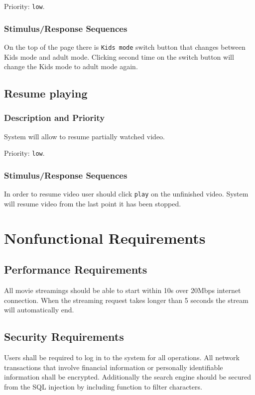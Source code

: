 \documentclass{scrreprt}
\begin{document}
Priority: \verb|low|.

\subsection{Stimulus/Response Sequences}

On the top of the page there is \verb|Kids mode| switch button that changes between Kids mode and adult mode. Clicking second time on the switch button will change the Kids mode to adult mode again.

\section{Resume playing}

\subsection{Description and Priority}

System will allow to resume partially watched video.

Priority: \verb|low|.

\subsection{Stimulus/Response Sequences}

In order to resume video user should click \verb|play| on the unfinished video. System will resume video from the last point it has been stopped. 

\chapter{Nonfunctional Requirements}

\section{Performance Requirements}

All movie streamings should be able to start within 10s over 20Mbps internet connection. When the streaming request takes longer than 5 seconds the stream will automatically end.

\section{Security Requirements}

Users shall be required to log in to the system for all operations. All network transactions that involve financial information or personally identifiable information shall be encrypted.
Additionally the search engine should be secured from the SQL injection by including function to filter characters.
\end{document}
